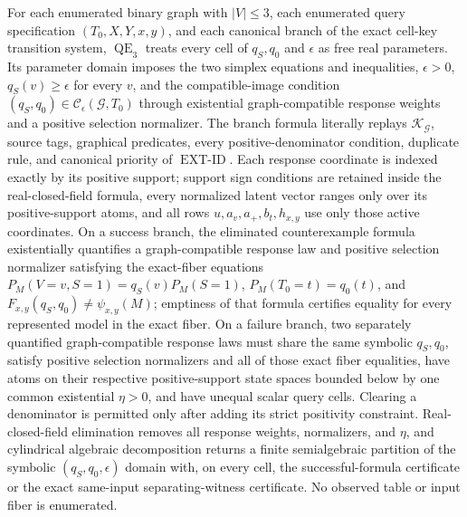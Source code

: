 For each enumerated binary graph with \(\lvert V\rvert\le3\), each enumerated query specification \((T_0,X,Y,x,y)\), and each canonical branch of the exact cell-key transition system, \(\operatorname{QE}_3\) treats every cell of \(q_S,q_0\) and \(\epsilon\) as free real parameters. Its parameter domain imposes the two simplex equations and inequalities, \(\epsilon>0\), \(q_S(v)\ge\epsilon\) for every \(v\), and the compatible-image condition \((q_S,q_0)\in\mathcal C_{\epsilon}(\mathcal G,T_0)\) through existential graph-compatible response weights and a positive selection normalizer. The branch formula literally replays \(\mathscr K_{\mathcal G}\), source tags, graphical predicates, every positive-denominator condition, duplicate rule, and canonical priority of \(\operatorname{EXT\text{-}ID}\). Each response coordinate is indexed exactly by its positive support; support sign conditions are retained inside the real-closed-field formula, every normalized latent vector ranges only over its positive-support atoms, and all rows \(u,a_v,a_+,b_t,h_{x,y}\) use only those active coordinates. On a success branch, the eliminated counterexample formula existentially quantifies a graph-compatible response law and positive selection normalizer satisfying the exact-fiber equations \(P_M(V=v,S=1)=q_S(v)P_M(S=1)\), \(P_M(T_0=t)=q_0(t)\), and \(F_{x,y}(q_S,q_0)\ne\psi_{x,y}(M)\); emptiness of that formula certifies equality for every represented model in the exact fiber. On a failure branch, two separately quantified graph-compatible response laws must share the same symbolic \(q_S,q_0\), satisfy positive selection normalizers and all of those exact fiber equalities, have atoms on their respective positive-support state spaces bounded below by one common existential \(\eta>0\), and have unequal scalar query cells. Clearing a denominator is permitted only after adding its strict positivity constraint. Real-closed-field elimination removes all response weights, normalizers, and \(\eta\), and cylindrical algebraic decomposition returns a finite semialgebraic partition of the symbolic \((q_S,q_0,\epsilon)\) domain with, on every cell, the successful-formula certificate or the exact same-input separating-witness certificate. No observed table or input fiber is enumerated.
